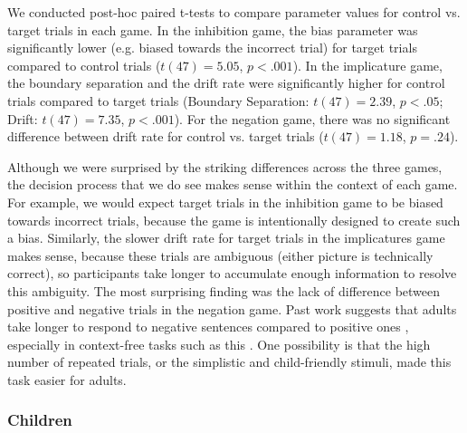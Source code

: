 \documentclass[10pt,letterpaper]{article}
\begin{document}
We conducted post-hoc paired t-tests to compare parameter values for control vs. target trials in each game.  In the inhibition game, the bias parameter was significantly lower (e.g. biased towards the incorrect trial) for target trials compared to control trials ($t(47) = 5.05$, $p< .001$).  In the implicature game, the boundary separation and the drift rate were significantly higher for control trials compared to target trials (Boundary Separation: $t(47) = 2.39$, $p< .05$; Drift: $t(47) = 7.35$, $p< .001$).  For the negation game, there was no significant difference between drift rate for control vs. target trials ($t(47) = 1.18$, $p = .24$).  

Although we were surprised by the striking differences across the three games, the decision process that we do see makes sense within the context of each game.  For example, we would expect target trials in the inhibition game to be biased towards incorrect trials, because the game is intentionally designed to create such a bias.  Similarly, the slower drift rate for target trials in the implicatures game makes sense, because these trials are ambiguous (either picture is technically correct), so participants take longer to accumulate enough information to resolve this ambiguity.  The most surprising finding was the lack of difference between positive and negative trials in the negation game.  Past work suggests that adults take longer to respond to negative sentences compared to positive ones \cite{hclark1972}, especially in context-free tasks such as this \cite{nordmeyer2014a}.  One possibility is that the high number of repeated trials, or the simplistic and child-friendly stimuli, made this task easier for adults.

\subsubsection{Children}
\end{document}
